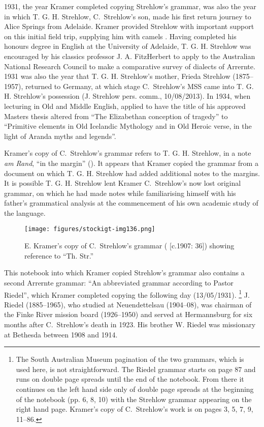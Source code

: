 1931, the year Kramer completed copying Strehlow’s grammar, was also the year in which T. G. H. Strehlow, C.~Strehlow’s son, made his first return journey to Alice Springs from Adelaide. Kramer provided Strehlow with important support on this initial field trip, supplying him with camels \citep[150]{hill_broken_2002}. Having completed his honours degree in English at the University of Adelaide, T. G. H. Strehlow was encouraged by his classics professor J. A. FitzHerbert to apply to the Australian National Research Council to make a comparative survey of dialects of Arrernte. 1931 was also the year that T. G. H. Strehlow’s mother, Frieda Strehlow (1875--1957), returned to Germany, at which stage C.~Strehlow’s MSS came into T. G. H. Strehlow’s possession (J. Strehlow pers. comm., 10/08/2013). In 1934, when lecturing in Old and Middle English, \citet{strehlow_letter_1934} applied to have the title of his approved Masters thesis altered from “The Elizabethan conception of tragedy” to “Primitive elements in Old Icelandic Mythology and in Old Heroic verse, in the light of Aranda myths and legends''.

Kramer’s copy of C.~Strehlow’s grammar refers to T. G. H. Strehlow, in a note \textit{am Rand}, “in the margin” (). It appears that Kramer copied the grammar from a document on which T. G. H. Strehlow had added additional notes to the margins. It is possible T. G. H. Strehlow lent Kramer C.~Strehlow’s now lost original grammar, on which he had made notes while familiarising himself with his father’s grammatical analysis at the commencement of his own academic study of the language.

\begin{figure}
\texttt{[image: figures/stockigt-img136.png]}
\caption{E. Kramer’s copy of C.~Strehlow's grammar (\citeyear{strehlow_untitled_1931} [c.1907: 36]) showing reference to “Th. Str.''}
\label{bkm:Ref456020911}\label{fig:key:9-187}
\end{figure}

This notebook into which Kramer copied Strehlow’s grammar also contains a second Arrernte grammar: “An abbreviated grammar according to Pastor Riedel”, which Kramer completed copying the following day (13/05/1931). \footnote{The South Australian Museum pagination of the two grammars, which is used here, is not straightforward. The Riedel grammar starts on page 87 and runs on double page spreads until the end of the notebook. From there it continues on the left hand side only of double page spreads at the beginning of the notebook (pp. 6, 8, 10) with the Strehlow grammar appearing on the right hand page. Kramer’s copy of C.~Strehlow’s work is on pages 3, 5, 7, 9, 11--86.} J. Riedel (1885--1965), who studied at Neuendettelsau (1904--08), was chairman of the Finke River mission board (1926--1950) and served at Hermannsburg for six months after C.~Strehlow’s death in 1923. His brother W. Riedel was missionary at Bethesda between 1908 and 1914.

